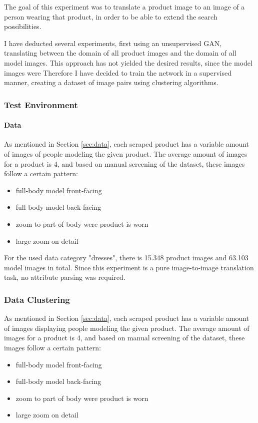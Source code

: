 \documentclass{article}
\begin{document}
The goal of this experiment was to translate a product image to an image of a person wearing that product, in order to be able to extend the search possibilities.

I have deducted several experiments, first using an unsupervised GAN, translating between the domain of all product images and the domain of all model images. This approach has not yielded the desired results, since the model images were  Therefore I have decided to train the network in a supervised manner, creating a dataset of image pairs using clustering algorithms.

\subsubsection{Test Environment}

\paragraph{Data}
As mentioned in Section \ref{sec:data}, each scraped product has a variable amount of images of people modeling the given product. The average amount of images for a product is 4, and based on manual screening of the dataset, these images follow a certain pattern:
\begin{itemize}
\item full-body model front-facing
\item full-body model back-facing
\item zoom to part of body were product is worn
\item large zoom on detail
\end{itemize}

For the used data category "dresses", there is 15.348 product images and 63.103 model images in total. Since this experiment is a pure image-to-image translation task, no attribute parsing was required. 


\subsubsection{Data Clustering}
As mentioned in Section \ref{sec:data}, each scraped product has a variable amount of images displaying people modeling the given product. The average amount of images for a product is 4, and based on manual screening of the dataset, these images follow a certain pattern:
\begin{itemize}
\item full-body model front-facing
\item full-body model back-facing
\item zoom to part of body were product is worn
\item large zoom on detail
\end{itemize}
\end{document}
